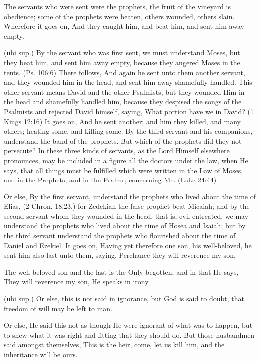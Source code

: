  The servants who were sent were the prophets, the fruit of the vineyard is obedience; some of the prophets were beaten, others wounded, others slain. Wherefore it goes on, And they caught him, and beat him, and sent him away empty.

 (ubi sup.) By the servant who was first sent, we must understand Moses, but they beat him, and sent him away empty, because they angered Moses in the tents. (Ps. 106:6) There follows, And again he sent unto them another servant, and they wounded him in the head, and sent him away shamefully handled. This other servant means David and the other Psalmists, but they wounded Him in the head and shamefully handled him, because they despised the songs of the Psalmists and rejected David himself, saying, What portion have we in David? (1 Kings 12:16) It goes on, And he sent another; and him they killed, and many others; heating some, and killing some. By the third servant and his companions, understand the band of the prophets. But which of the prophets did they not persecute? In these three kinds of servants, as the Lord Himself elsewhere pronounces, may be included in a figure all the doctors under the law, when He says, that all things must be fulfilled which were written in the Law of Moses, and in the Prophets, and in the Psalms, concerning Me. (Luke 24:44)

 Or else, By the first servant, understand the prophets who lived about the time of Elias, (2 Chron. 18:23.) for Zedekiah the false prophet beat Micaiah; and by the second servant whom they wounded in the head, that is, evil entreated, we may understand the prophets who lived about the time of Hosea and Isaiah; but by the third servant understand the prophets who flourished about the time of Daniel and Ezekiel. It goes on, Having yet therefore one son, his well-beloved, he sent him also last unto them, saying, Perchance they will reverence my son.

 The well-beloved son and the last is the Only-begotten; and in that He says, They will reverence my son, He speaks in irony.

 (ubi sup.) Or else, this is not said in ignorance, but God is said to doubt, that freedom of will may be left to man.

 Or else, He said this not as though He were ignorant of what was to happen, but to shew what it was right and fitting that they should do. But those husbandmen said amongst themselves, This is the heir, come, let us kill him, and the inheritance will be ours.

